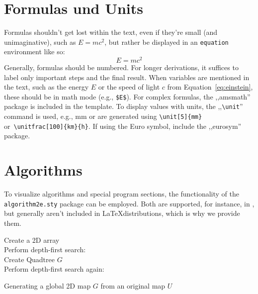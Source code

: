 \section{Formulas und Units}
\label{sec:floats:formulas}
 Formulas shouldn't get lost within the text, even if they're small (and unimaginative), such as $E=mc^2$, but rather be displayed in an \verb|equation| environment like so:
\begin{equation}
  \label{eq:einstein}
  E=mc^2 
\end{equation}
Generally, formulas should be numbered. For longer derivations, it suffices to label only important steps and the final result. When variables are mentioned in the text, such as the energy $E$ or the speed of light $c$ from Equation~\ref{eq:einstein}, these should be in math mode (e.g., \verb|$E$|). For complex formulas, the ,,amsmath'' package is included in the template. To display values with units, the ,,\verb|\unit|'' command is used, e.g., \unit[5]{mm} or  are generated using \verb|\unit[5]{mm}| or\ \verb|\unitfrac[100]{km}{h}|. If using the Euro symbol, include the ,,eurosym'' package.

\section{Algorithms}
\label{sec:floats:algo}
 To visualize algorithms and special program sections, the functionality of the \verb|algorithm2e.sty| package can be employed. Both are supported, for instance, in \cite{WWWDante}, but generally aren't included in \LaTeX distributions, which is why we provide them.

\begin{algorithm}
  Create a 2D array\\
  Perform depth-first search:\\
Create Quadtree $G$\\
Perform depth-first search again:\\
\caption{Generating a global 2D map $G$ from an original map $U$}
\label{alg:example}
\end{algorithm}

